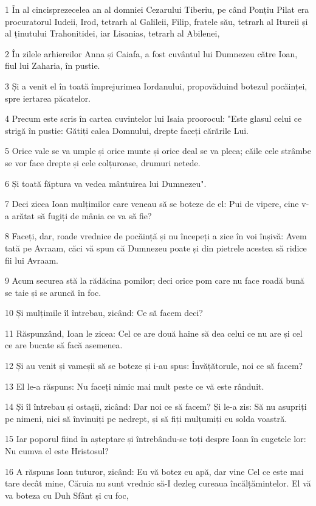 \par 1 În al cincisprezecelea an al domniei Cezarului Tiberiu, pe când Ponțiu Pilat era procuratorul Iudeii, Irod, tetrarh al Galileii, Filip, fratele său, tetrarh al Itureii și al ținutului Trahonitidei, iar Lisanias, tetrarh al Abilenei,
\par 2 În zilele arhiereilor Anna și Caiafa, a fost cuvântul lui Dumnezeu către Ioan, fiul lui Zaharia, în pustie.
\par 3 Și a venit el în toată împrejurimea Iordanului, propovăduind botezul pocăinței, spre iertarea păcatelor.
\par 4 Precum este scris în cartea cuvintelor lui Isaia proorocul: "Este glasul celui ce strigă în pustie: Gătiți calea Domnului, drepte faceți cărările Lui.
\par 5 Orice vale se va umple și orice munte și orice deal se va pleca; căile cele strâmbe se vor face drepte și cele colțuroase, drumuri netede.
\par 6 Și toată făptura va vedea mântuirea lui Dumnezeu".
\par 7 Deci zicea Ioan mulțimilor care veneau să se boteze de el: Pui de vipere, cine v-a arătat să fugiți de mânia ce va să fie?
\par 8 Faceți, dar, roade vrednice de pocăință și nu începeți a zice în voi înșivă: Avem tată pe Avraam, căci vă spun că Dumnezeu poate și din pietrele acestea să ridice fii lui Avraam.
\par 9 Acum securea stă la rădăcina pomilor; deci orice pom care nu face roadă bună se taie și se aruncă în foc.
\par 10 Și mulțimile îl întrebau, zicând: Ce să facem deci?
\par 11 Răspunzând, Ioan le zicea: Cel ce are două haine să dea celui ce nu are și cel ce are bucate să facă asemenea.
\par 12 Și au venit și vameșii să se boteze și i-au spus: Învățătorule, noi ce să facem?
\par 13 El le-a răspuns: Nu faceți nimic mai mult peste ce vă este rânduit.
\par 14 Și îl întrebau și ostașii, zicând: Dar noi ce să facem? Și le-a zis: Să nu asupriți pe nimeni, nici să învinuiți pe nedrept, și să fiți mulțumiți cu solda voastră.
\par 15 Iar poporul fiind în așteptare și întrebându-se toți despre Ioan în cugetele lor: Nu cumva el este Hristosul?
\par 16 A răspuns Ioan tuturor, zicând: Eu vă botez cu apă, dar vine Cel ce este mai tare decât mine, Căruia nu sunt vrednic să-I dezleg cureaua încălțămintelor. El vă va boteza cu Duh Sfânt și cu foc,

